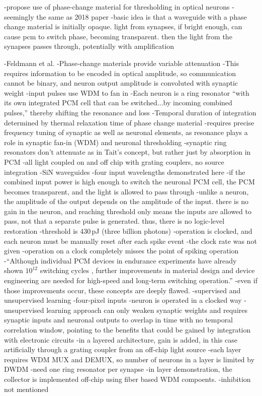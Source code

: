 \cite{chsa2019}
-propose use of phase-change material for thresholding in optical neurons
-seemingly the same as 2018 paper
-basic idea is that a waveguide with a phase change material is initially opaque. light from synapses, if bright enough, can cause pcm to switch phase, becoming transparent. then the light from the synapses passes through, potentially with amplification

\cite{feyo2019}
-Feldmann et al.
-Phase-change materials provide variable attenuation
-This requires information to be encoded in optical amplitude, so communication cannot be binary, and neuron output amplitude is convoluted with synaptic weight
-input pulses use WDM to fan in
-Each neuron is a ring resonator ``with its own integrated PCM cell that can be switched...by incoming combined pulses,'' thereby shifting the resonance and loss
-Temporal duration of integration determined by thermal relaxation time of phase change material
-requires precise frequency tuning of synaptic as well as neuronal elements, as resonance plays a role in synaptic fan-in (WDM) and neuronal thresholding
-synaptic ring resonators don't attenuate as in Tait's concept, but rather just by absorption in PCM
-all light coupled on and off chip with grating couplers, no source integration
-SiN waveguides
-four input wavelengths demonstrated here
-if the combined input power is high enough to switch the neuronal PCM cell, the PCM becomes transparent, and the light is allowed to pass through
-unlike a neuron, the amplitude of the output depends on the amplitude of the input. there is no gain in the neuron, and reaching threshold only means the inputs are allowed to pass, not that a separate pulse is generated. thus, there is no logic-level restoration
-threshold is 430\,pJ (three billion photons)
-operation is clocked, and each neuron must be manually reset after each spike event
-the clock rate was not given
-operation on a clock completely misses the point of spiking operation
-``Although individual PCM devices in endurance experiments have already shown $10^{12}$ switching cycles \cite{}, further improvements in material design and device engineering are needed for high-speed and long-term switching operation.''
-even if those improvements occur, these concepts are deeply flawed.
-supervised and unsupervised learning
-four-pixel inputs
-neuron is operated in a clocked way
-unsupervised learning approach can only weaken synaptic weights and requires synaptic inputs and neuronal outputs to overlap in time with no temporal correlation window, pointing to the benefits that could be gained by integration with electronic circuits
-in a layered architecture, gain is added, in this case artificially through a grating coupler from an off-chip light source
-each layer requires WDM MUX and DEMUX, so number of neurons in a layer is limited by DWDM
-need one ring resonator per synapse
-in layer demonstration, the collector is implemented off-chip using fiber based WDM compoents.
-inhibition not mentioned 



